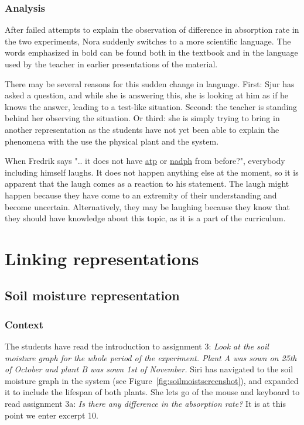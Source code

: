 \subsubsection*{Analysis}
After failed attempts to explain the observation of difference in absorption rate in the two experiments, Nora suddenly switches to a more scientific language. The words emphasized in bold can be found both in the textbook and in the language used by the teacher in earlier presentations of the material.

There may be several reasons for this sudden change in language. First: Sjur has asked a question, and while she is answering this, she is looking at him as if he knows the answer, leading to a test-like situation. Second: the teacher is standing behind her observing the situation. Or third: she is simply trying to bring in another representation as the students have not yet been able to explain the phenomena with the use the physical plant and the system. 

When Fredrik says ".. it does not have \underline{atp} or \underline{nadph} from before?", everybody including himself laughs. It does not happen anything else at the moment, so it is apparent that the laugh comes as a reaction to his statement. The laugh might happen because they have come to an extremity of their understanding and become uncertain. Alternatively, they may be laughing because they know that they should have knowledge about this topic, as it is a part of the curriculum.


\section{Linking representations}
\label{cha:linking}
\subsection{Soil moisture representation}


\subsubsection*{Context}
The students have read the introduction to assignment 3: \emph{Look at the soil moisture graph for the whole period of the experiment. Plant A was sown on 25th of October and plant B was sown 1st of November.} Siri has navigated to the soil moisture graph in the system (see Figure~\ref{fig:soilmoistscreenshot}), and expanded it to include the lifespan of both plants. She lets go of the mouse and keyboard to read assignment 3a: \emph{Is there any difference in the absorption rate?} It is at this point we enter excerpt 10.



